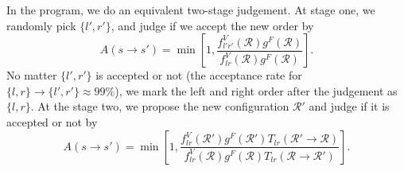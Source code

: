 \documentclass[12pt,letterpaper,UTF8]{report}
\begin{document}
In the program, we do an equivalent two-stage judgement.
At stage one, we randomly pick $\{l',r'\}$, and judge if we accept the new order by
\begin{equation}
A (s\rightarrow s') \! = \!
\min \! \left[  1,
\frac{ f^V_{l'r'}(\mathcal{R}) g^F(\mathcal{R})  }
{ f^V_{lr}(\mathcal{R}) g^F(\mathcal{R})  }
\right] .
\end{equation}
No matter $\{l',r'\}$  is accepted or not (the acceptance rate for $\{l,r\} \rightarrow \{l',r'\} \approx 99\%$), we mark the left and right order after the judgement as $\{l,r\}$.
At the stage two, we propose the new configuration $\mathcal{R}'$ and judge if it is accepted or not by
\begin{equation}
A (s\rightarrow s') \! = \!
\min \! \left[  1,
\frac{ f^V_{lr}(\mathcal{R}') g^F(\mathcal{R}')  T_{lr}(\mathcal{R}' \! \rightarrow \! \mathcal{R})  }
{ f^V_{lr}(\mathcal{R}) g^F(\mathcal{R}) T_{lr}(\mathcal{R} \! \rightarrow \! \mathcal{R}') }
\right] .
\end{equation}
\end{document}
